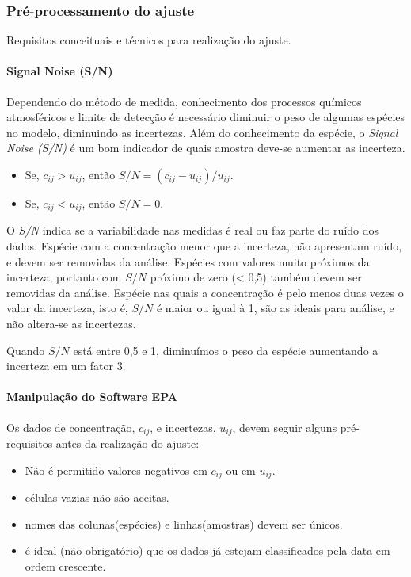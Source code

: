 \subsubsection{Pré-processamento do ajuste}
Requisitos conceituais e técnicos para realização do ajuste.

\paragraph{Signal Noise (S/N)}

Dependendo do método de medida, conhecimento dos processos químicos 
atmosféricos e limite de detecção é necessário diminuir o peso de algumas 
espécies no modelo, diminuindo as incertezas. 
Além do conhecimento da espécie, o \textit{Signal Noise (S/N)} é um bom 
indicador de quais amostra deve-se aumentar as incerteza.

\begin{itemize}
  \item Se, $c_{ij} >  u_{ij}$, então $ S/N = (c_{ij} - u_{ij})/u_{ij}$.
  \item Se, $c_{ij} <  u_{ij}$, então $S/N = 0 $.
\end{itemize}

O \textit{S/N} indica se a variabilidade nas medidas é real ou faz parte do 
ruído dos dados. 
Espécie com a concentração menor que a incerteza, não apresentam ruído, e devem 
ser removidas da análise. Espécies com valores muito próximos da incerteza, 
portanto com $S/N$ próximo de zero (< 0,5) também devem ser removidas da 
análise. 
Espécie nas quais a concentração é pelo menos duas vezes o valor da incerteza, 
isto é, $S/N$ é maior ou igual à 1, são as ideais para análise, 
e não altera-se as incertezas. 

Quando $S/N$ está entre 0,5 e 1, diminuímos o peso da espécie aumentando a 
incerteza em um fator 3.  

\paragraph{Manipulação do Software EPA}

Os dados de concentração, $c_{ij}$, e incertezas, $u_{ij}$, devem seguir 
alguns pré-requisitos antes da realização do ajuste:

\begin{itemize}
  \item Não é permitido valores negativos em $c_{ij}$ ou em $u_{ij}$.
  \item células vazias não são aceitas.
  \item nomes das colunas(espécies) e linhas(amostras) devem ser únicos.
  \item é ideal (não obrigatório) que os dados já estejam classificados 
        pela data em ordem crescente.
\end{itemize}

